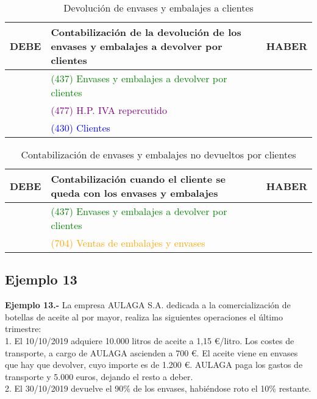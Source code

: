 \documentclass{article}
\begin{document}
\begin{table}[H]
\centering
\begin{tabular}{|p{4cm}|p{4cm}|p{4cm}|}
\hline
\textbf{DEBE} & \textbf{Contabilización de la devolución de los envases y embalajes a devolver por clientes} & \textbf{HABER} \\
\hline
& \textcolor{green}{(437) Envases y embalajes a devolver por clientes} & \\
& \textcolor{purple}{(477) H.P. IVA repercutido} & \\
& \textcolor{blue}{(430) Clientes} & \\
\hline
\end{tabular}
\caption{Devolución de envases y embalajes a clientes}
\end{table}

\begin{table}[H]
\centering
\begin{tabular}{|p{4cm}|p{4cm}|p{4cm}|}
\hline
\textbf{DEBE} & \textbf{Contabilización cuando el cliente se queda con los envases y embalajes} & \textbf{HABER} \\
\hline
& \textcolor{green}{(437) Envases y embalajes a devolver por clientes} & \\
& \textcolor{orange}{(704) Ventas de embalajes y envases} & \\
\hline
\end{tabular}
\caption{Contabilización de envases y embalajes no devueltos por clientes}
\end{table}

\subsection{Ejemplo 13}

\textbf{Ejemplo 13.-} La empresa AULAGA S.A. dedicada a la comercialización de botellas de aceite al por mayor, realiza las siguientes operaciones el último trimestre:\\

1. El 10/10/2019 adquiere 10.000 litros de aceite a 1,15 €/litro. Los costes de transporte, a cargo de AULAGA ascienden a 700 €. El aceite viene en envases que hay que devolver, cuyo importe es de 1.200 €. AULAGA paga los gastos de transporte y 5.000 euros, dejando el resto a deber.\\

2. El 30/10/2019 devuelve el 90\% de los envases, habiéndose roto el 10\% restante.\\
\end{document}

